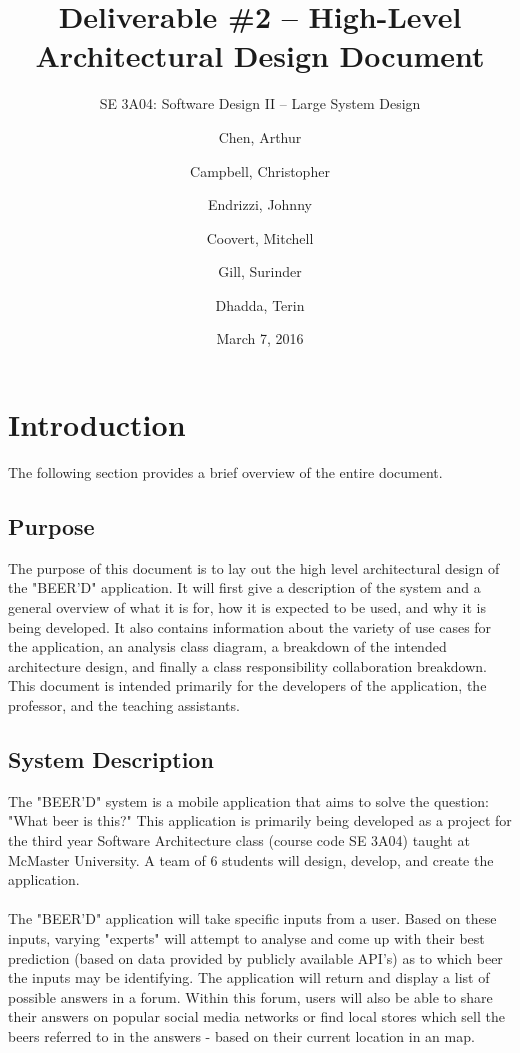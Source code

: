 \documentclass[]{article}
\title{Deliverable \#2 -- High-Level Architectural Design Document}
\author{SE 3A04: Software Design II -- Large System Design}
\author{Chen, Arthur \and Campbell, Christopher \and Endrizzi, Johnny \\ 
\and Coovert, Mitchell \and Gill, Surinder \and Dhadda, Terin}
\date{March 7, 2016}
\begin{document}
\maketitle	
\newpage
\tableofcontents
\listoffigures
\listoftables
\newpage

\section{Introduction}
\label{sec:introduction}
The following section provides a brief overview of the entire document.

\subsection{Purpose}
\label{sub:purpose}
The purpose of this document is to lay out the high level architectural design of the "BEER'D" application. It will first give a description of the system and a general overview of what it is for, how it is expected to be used, and why it is being developed. It also contains information about the variety of use cases for the application, an analysis class diagram, a breakdown of the intended architecture design, and finally a class responsibility collaboration breakdown. This document is intended primarily for the developers of the application, the professor, and the teaching assistants.

\subsection{System Description}
\label{sub:system_description}
The "BEER'D" system is a mobile application that aims to solve the question: "What beer is this?" This application is primarily being developed as a project for the third year Software Architecture class (course code SE 3A04) taught at McMaster University. A team of 6 students will design, develop, and create the application.\\
\\
The "BEER'D" application will take specific inputs from a user. Based on these inputs, varying "experts" will attempt to analyse and come up with their best prediction (based on data provided by publicly available API's) as to which beer the inputs may be identifying. The application will return and display a list of possible answers in a forum. Within this forum, users will also be able to share their answers on popular social media networks or find local stores which sell the beers referred to in the answers - based on their current location in an map.
\end{document}
